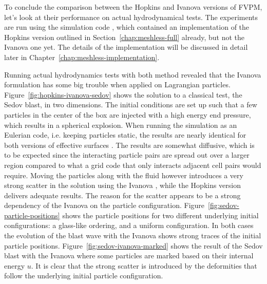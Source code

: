 To conclude the comparison between the Hopkins and Ivanova versions of FVPM, let's look at their
performance on actual hydrodynamical tests. The experiments are run using the simulation code \swift \citep{schallerSWIFTSPHInterdependent2018a}, which contained an implementation of the Hopkins version outlined in Section~\ref{chap:meshless-full} already, but not the Ivanova one yet. The details of the implementation will be discussed in detail later in Chapter~\ref{chap:meshless-implementation}.

Running actual hydrodynamics tests with both method revealed that the Ivanova formulation has some
big trouble when applied on Lagrangian particles. Figure~\ref{fig:hopkins-ivanova-sedov} shows the
solution to a classical test, the Sedov blast, in two dimensions. The initial conditions are set up
such that a few particles in the center of the box are injected with a high energy end pressure,
which results in a spherical explosion. When running the simulation as an Eulerian code, i.e.
keeping particles static, the results are nearly identical for both versions of effective surfaces
\Aij. The results are somewhat diffusive, which is to be expected since the interacting particle
pairs are spread out over a larger region compared to what a grid code that only interacts adjacent
cell pairs would require. Moving the particles along with the fluid however introduces a very strong scatter in the solution using the Ivanova \Aij, while the Hopkins version delivers adequate results.
The reason for the scatter appears to be a strong dependency of the Ivanova \Aij on the particle
configuration. Figure~\ref{fig:sedov-particle-positions} shows the particle positions for two
different underlying initial configurations: a glass-like ordering, and a uniform configuration. In
both cases the evolution of the blast wave with the Ivanova \Aij shows strong traces of the initial
particle positions. Figure~\ref{fig:sedov-ivanova-marked} shows the result of the Sedov blast with
the Ivanova \Aij where some particles are marked based on their internal energy $u$. It is clear
that the strong scatter is introduced by the deformities that follow the underlying initial particle configuration.


